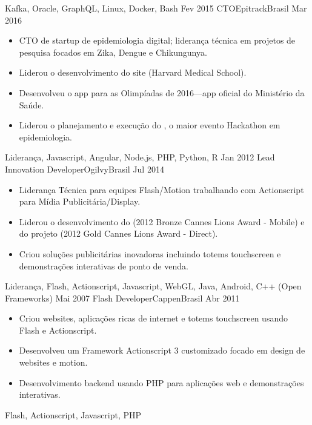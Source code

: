 \begin{experiences}
{                    }
                    {Kafka, Oracle, GraphQL, Linux, Docker, Bash}
  \emptySeparator
  \experience
    {Fev 2015}     {CTO}{Epitrack}{Brasil}
    {Mar 2016}    {
                      \begin{itemize}
                        \item CTO de startup de epidemiologia digital; liderança técnica em projetos de pesquisa focados em Zika, Dengue e Chikungunya.
                        \item Liderou o desenvolvimento do site  (Harvard Medical School).
                        \item Desenvolveu o app  para as Olimpíadas de 2016—app oficial do Ministério da Saúde.
                        \item Liderou o planejamento e execução do , o maior evento Hackathon em epidemiologia.
                      \end{itemize}
                    }
                    {Liderança, Javascript, Angular, Node.js, PHP, Python, R}
  \emptySeparator
  \experience
    {Jan 2012}     {Lead Innovation Developer}{Ogilvy}{Brasil}
    {Jul 2014}    {
                      \begin{itemize}
                        \item Liderança Técnica para equipes Flash/Motion trabalhando com Actionscript para Mídia Publicitária/Display.
                        \item Liderou o desenvolvimento do  (2012 Bronze Cannes Lions Award - Mobile) e do projeto  (2012 Gold Cannes Lions Award - Direct).
                        \item Criou soluções publicitárias inovadoras incluindo totems touchscreen e demonstrações interativas de ponto de venda.
                      \end{itemize}
                    }
                    {Liderança, Flash, Actionscript, Javascript, WebGL, Java, Android, C++ (Open Frameworks)}
  \emptySeparator
  \experience
    {Mai 2007}     {Flash Developer}{Cappen}{Brasil}
    {Abr 2011}    {
                      \begin{itemize}
                        \item Criou websites, aplicações ricas de internet e totems touchscreen usando Flash e Actionscript.
                        \item Desenvolveu um Framework Actionscript 3 customizado focado em design de websites e motion.
                        \item Desenvolvimento backend usando PHP para aplicações web e demonstrações interativas.
                      \end{itemize}
                    }
                    {Flash, Actionscript, Javascript, PHP}
  \emptySeparator
\end{experiences}
